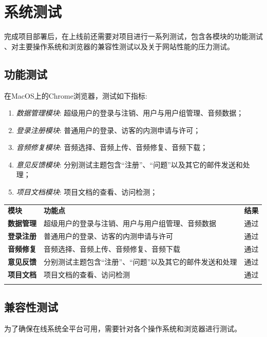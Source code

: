 \documentclass{morningstar}
\begin{document}
\clearpage
\section{系统测试}

完成项目部署后，在上线前还需要对项目进行一系列测试，包含各模块的功能测试
、对主要操作系统和浏览器的兼容性测试以及关于网站性能的压力测试。

\subsection{功能测试}

在MacOS上的Chrome浏览器，测试如下指标: 

\begin{enumerate}
\item \emph{数据管理模块}: 超级用户的登录与注销、用户与用户组管理、音频数据；
\item \emph{登录注册模块}: 普通用户的登录、访客的内测申请与许可；
\item \emph{音频修复模块}: 音频选择、音频上传、音频修复、音频下载；
\item \emph{意见反馈模块}: 分别测试主题包含“注册”、“问题”以及其它的邮件发送和处理；
\item \emph{项目文档模块}: 项目文档的查看、访问检测；
\end{enumerate}

\begin{table}[htbp]
    \centering
    \begin{tabular}{p{2cm}p{11cm}p{1cm}}
    \thickhline
    \textbf{模块}       & \textbf{功能点} & \textbf{结果}  \\ 
    \thickhline
    \textbf{数据管理}  &  超级用户的登录与注销、用户与用户组管理、音频数据 &  通过 \\
    \textbf{登录注册}  &  普通用户的登录、访客的内测申请与许可 &  通过 \\
    \textbf{音频修复}  &  音频选择、音频上传、音频修复、音频下载 &  通过 \\
    \textbf{意见反馈}  &  分别测试主题包含“注册”、“问题”以及其它的邮件发送和处理 &  通过 \\
    \textbf{项目文档}  &  项目文档的查看、访问检测 &  通过 \\
    \thickhline 
    \end{tabular}
\end{table}

\subsection{兼容性测试}
为了确保在线系统全平台可用，需要针对各个操作系统和浏览器进行测试。
\end{document}
